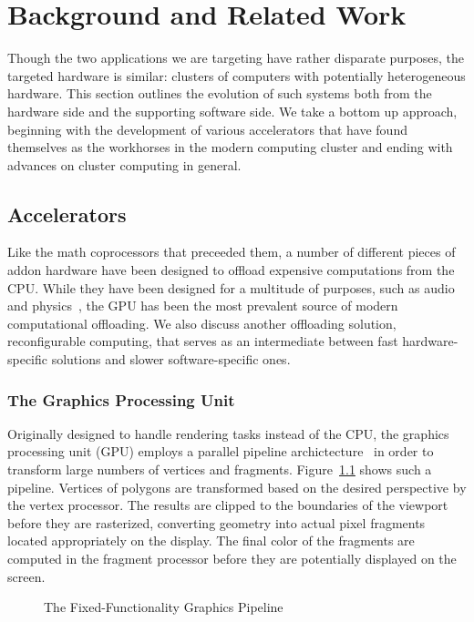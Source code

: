 \chapter{Background and Related Work}
\label{chapter:background}

Though the two applications we are targeting have rather disparate
purposes, the targeted hardware is similar: clusters of computers with
potentially heterogeneous hardware.  This section outlines the evolution
of such systems both from the hardware side and the supporting software
side. We take a bottom up approach, beginning with the development of
various accelerators that have found themselves as the workhorses in
the modern computing cluster and ending with advances on cluster computing
in general.

\section{Accelerators}

Like the math coprocessors that preceeded them, a number of different
pieces of addon hardware have been designed to offload expensive
computations from the CPU. While they have been designed for a multitude
of purposes, such as audio and physics~\cite{physx}, the GPU has been
the most prevalent source of modern computational offloading. We also discuss
another offloading solution, reconfigurable computing, that serves as an
intermediate between fast hardware-specific solutions and slower software-specific
ones.

\subsection{The Graphics Processing Unit}

Originally designed to handle rendering tasks instead of the CPU,
the graphics processing unit (GPU) employs a parallel pipeline
archictecture~\cite{angel_graphics} in order to transform large numbers
of vertices and fragments. Figure~\ref{fig:graphics_pipeline} shows such a
pipeline. Vertices of polygons are transformed based on the desired
perspective by the vertex processor. The results are clipped to the
boundaries of the viewport before they are rasterized, converting geometry
into actual pixel fragments located appropriately on the display. The
final color of the fragments are computed in the fragment processor
before they are potentially displayed on the screen.

\begin{figure}
\begin{center}
\end{center}
\caption{The Fixed-Functionality Graphics Pipeline}
\label{fig:graphics_pipeline}
\end{figure}


